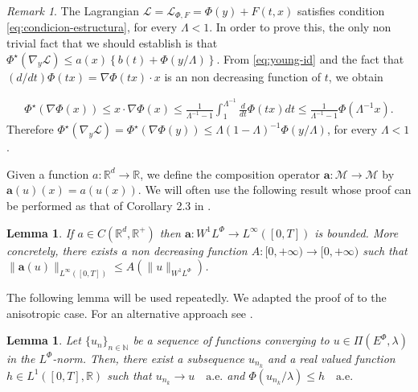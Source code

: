 \documentclass[twoside]{article}
\newtheorem{lem}[thm]{Lemma}
\theoremstyle{remark}
\newtheorem{comentario}{Remark}
\newcommand{\lphi}{L^{\Phi}}
\newcommand{\ephi}{E^{\Phi}}
\newcommand{\wphi}{W^{1}\lphi}
\renewcommand{\b}[1]{\boldsymbol{#1}}
\newcommand{\rr}{\mathbb{R}}
\renewcommand{\leq}{\leqslant}
\begin{document}
\begin{comentario}\label{com:lphi-satis S}
 The Lagrangian $\mathcal{L}=\mathcal{L}_{\Phi,F}=\Phi(y)+F(t,x)$ satisfies condition  \eqref{eq:condicion-estructura}, for every $\Lambda<1$. In order to prove this, the only non trivial fact that we should establish is that $ \Phi^{\star}(\nabla_{y}\mathcal{L})
\leq
a(x)\left\{b(t)+ \Phi\left({y}/{\Lambda}\right)\right\}$. From  \ref{eq:young-id} and the fact that $(d/dt)\Phi(tx)=\nabla\Phi(tx)\cdot x$ is an non decreasing function of $t$, we obtain  

\[
  \begin{split}
     \Phi^{\star}(\nabla \Phi (x))\leq  x\cdot \nabla\Phi(x) \leq\frac{1}{\Lambda^{-1}-1}\int_1^{\Lambda^{-1}} \frac{d}{dt}\Phi(tx)dt \leq\frac{1}{\Lambda^{-1}-1}\Phi(\Lambda^{-1} x). \end{split}
\]
Therefore  $\Phi^{\star}(\nabla_{y}\mathcal{L})=\Phi^{\star}\left(\nabla\Phi(y)\right)\leq \Lambda(1-\Lambda)^{-1} \Phi(y/\Lambda )$, for every $\Lambda<1$. 
\end{comentario}

Given a function $a:\mathbb{R}^d\to \mathbb{R}$, we define the composition operator $\b{a}:\mathcal{M}\to \mathcal{M}$ by $\b{a}(u)(x)= a(u(x))$.
We will often use the following result whose proof can be performed as that of  Corollary 2.3 in \cite{ABGMS2015}.


\begin{lem}\label{lem:cota-a}
\label{a_bound} If $a\in C(\mathbb{R}^d,\mathbb{R}^+)$ then $\b{a}:\wphi\to L^{\infty}([0,T])$ is bounded.
More concretely,  there exists a non decreasing function $A:[0,+\infty)\to[0,+\infty)$ such that
 $\|\b{a}(u)\|_{L^{\infty}([0,T])}\leq A(\|u\|_{\wphi})$.
\end{lem}

The following lemma will be used repeatedly. We adapted the proof of 
\cite[Lemma 2.5]{ABGMS2015} to the anisotropic case.    For an alternative approach see \cite{chamra2017anisotropic}.  







\begin{lem}\label{segundo lema}
Let  $\{{u}_n\}_{n\in \mathbb{N}}$ be a sequence of  functions  converging to  ${u}\in \Pi(\ephi,\lambda)$  in the $\lphi$-norm. Then, there exist a subsequence
${u}_{n_k}$ and a real valued function $h\in L^1([0,T],\rr)$ such that ${u}_{n_k}\rightarrow {u} \quad\text{a.e.}$ and $\Phi({u}_{n_k}/\lambda)\leq h\quad\text{a.e.}$
\end{lem}
\end{document}
